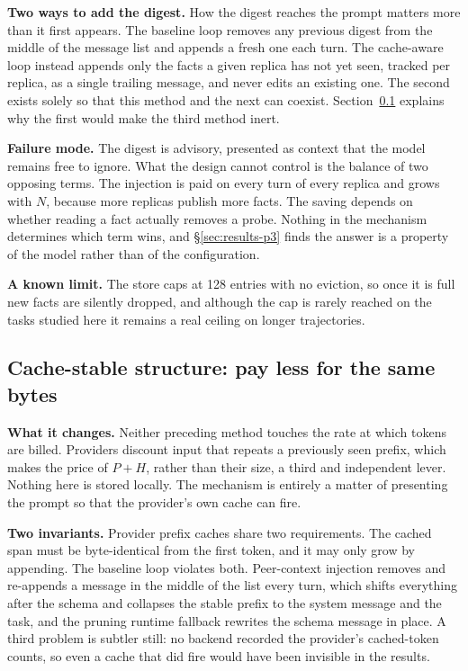 \documentclass[conference]{IEEEtran}
\begin{document}
\textbf{Two ways to add the digest.} How the digest reaches the prompt matters
more than it first appears. The baseline loop removes any previous digest from
the middle of the message list and appends a fresh one each turn. The
cache-aware loop instead appends only the facts a given replica has not yet
seen, tracked per replica, as a single trailing message, and never edits an
existing one. The second exists solely so that this method and the next can
coexist. Section~\ref{sec:pcache} explains why the first would make the third method
inert.

\textbf{Failure mode.} The digest is advisory, presented as context that the
model remains free to ignore. What the design cannot control is the balance of
two opposing terms. The injection is paid on every turn of every replica and
grows with $N$, because more replicas publish more facts. The saving depends on
whether reading a fact actually removes a probe. Nothing in the mechanism
determines which term wins, and §\ref{sec:results-p3} finds the answer is a
property of the model rather than of the configuration.

\textbf{A known limit.} The store caps at 128 entries with no eviction,
so once it is full new facts are silently dropped, and although the cap is
rarely reached on the tasks studied here it remains a real ceiling on longer
trajectories.

\subsection{Cache-stable structure: pay less for the same bytes}\label{sec:pcache}

\textbf{What it changes.} Neither preceding method touches the rate at which
tokens are billed. Providers discount input that repeats a previously seen
prefix, which makes the price of $P + H$, rather than their size, a third and
independent lever. Nothing here is stored locally. The mechanism is entirely a
matter of presenting the prompt so that the provider's own cache can fire.

\textbf{Two invariants.} Provider prefix caches share two requirements. The
cached span must be byte-identical from the first token, and it may only grow by
appending. The baseline loop violates both. Peer-context injection removes and
re-appends a message in the middle of the list every turn, which shifts
everything after the schema and collapses the stable prefix to the system
message and the task, and the pruning runtime fallback rewrites the schema message
in place. A third problem is subtler still: no backend recorded the provider's
cached-token counts, so even a cache that did fire would have been invisible in
the results.
\end{document}
